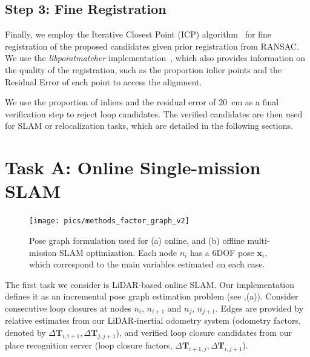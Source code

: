 \subsection*{\textbf{Step 3: Fine Registration}}
\label{subsubsec:fine-registration}
Finally, we employ the Iterative Closest Point (ICP) algorithm~\cite{besl1992icp} for fine registration of the proposed candidates given prior registration from RANSAC. We use the \emph{libpointmatcher} implementation~\cite{pomerleau2013iros}, which also provides information on the quality of the registration, such as the proportion inlier points and the Residual Error of each point to access the alignment.

We use the proportion of inliers and the residual error of \SI{20}{\centi\meter} as a final verification step to reject loop candidates. The verified candidates are then used for SLAM or relocalization tasks, which are detailed in the following sections.

\section{Task A: Online Single-mission SLAM} 
\label{sec:online_slam_mode}
\begin{figure}[t]
  \centering
  \texttt{[image: pics/methods\_factor\_graph\_v2]}
  \caption{Pose graph formulation used for (a) online, and (b) offline multi-mission SLAM optimization. Each node $n_{i}$ has a 6DOF pose $\mathbf{x}_{i}$, which correspond to the main variables estimated on each case.}
  \label{fig:factor_graph}
\end{figure}

The first task we consider is LiDAR-based online SLAM. Our implementation defines it as an incremental pose graph estimation problem (see ,(a)). Consider consecutive loop closures at nodes $n_{i}$, $n_{i+1}$ and $n_{j}$, $n_{j+1}$. Edges are provided by relative estimates from our LiDAR-inertial odometry system (odometry factors, denoted by $\Delta\mathbf{T}_{i,i+1}, \Delta\mathbf{T}_{j, j+1}$), and verified loop closure candidates from our place recognition server (loop closure factors, $\Delta\mathbf{T}_{i+1, j}, \Delta\mathbf{T}_{i, j+1}$).

